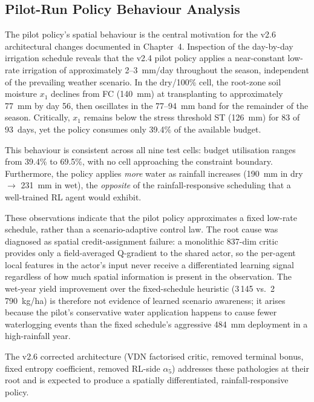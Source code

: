 
\subsection{Pilot-Run Policy Behaviour Analysis}

The pilot policy's spatial behaviour is the central motivation for the v2.6
architectural changes documented in Chapter~4. Inspection of the day-by-day irrigation
schedule reveals that the v2.4 pilot policy applies a near-constant low-rate
irrigation of approximately 2--3~mm/day throughout the season,
independent of the prevailing weather scenario.
In the dry/100\% cell, the root-zone soil moisture $x_1$ declines from FC (140~mm) at
transplanting to approximately 77~mm by day 56, then oscillates in the 77--94~mm band
for the remainder of the season.
Critically, $x_1$ remains below the stress threshold ST (126~mm) for 83 of 93~days, yet
the policy consumes only 39.4\% of the available budget.

This behaviour is consistent across all nine test cells: budget utilisation ranges from
39.4\% to 69.5\%, with no cell approaching the constraint boundary.
Furthermore, the policy applies \emph{more} water as rainfall increases
(190~mm in dry $\to$ 231~mm in wet), the \emph{opposite} of the rainfall-responsive
scheduling that a well-trained RL agent would exhibit.

These observations indicate that the pilot policy approximates a fixed low-rate
schedule, rather than a scenario-adaptive control law. The root cause was diagnosed
as spatial credit-assignment failure: a monolithic 837-dim critic provides only a
field-averaged Q-gradient to the shared actor, so the per-agent local features in
the actor's input never receive a differentiated learning signal regardless of how
much spatial information is present in the observation. The wet-year yield
improvement over the fixed-schedule heuristic (3\,145 vs.\ 2\,790~kg/ha) is therefore
not evidence of learned scenario awareness; it arises because the pilot's conservative
water application happens to cause fewer waterlogging events than the
fixed schedule's aggressive 484~mm deployment in a high-rainfall year.

The v2.6 corrected architecture (VDN factorised critic, removed terminal bonus,
fixed entropy coefficient, removed RL-side $\alpha_5$) addresses these pathologies
at their root and is expected to produce a spatially differentiated, rainfall-responsive
policy.

